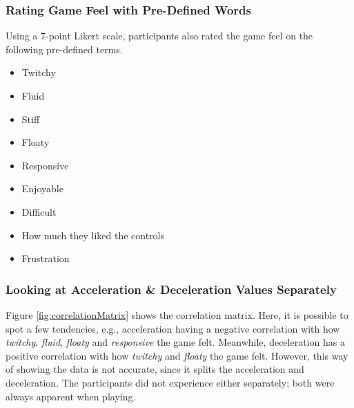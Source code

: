 \subsubsection{Rating Game Feel with Pre-Defined Words}
Using a 7-point Likert scale, participants also rated the game feel on the following pre-defined terms.
\begin{itemize}[noitemsep,nolistsep]
\item Twitchy
\item Fluid
\item Stiff
\item Floaty
\item Responsive
\item Enjoyable
\item Difficult
\item How much they liked the controls
\item Frustration
\end{itemize}

\subsubsection{Looking at Acceleration \& Deceleration Values Separately}
Figure \ref{fig:correlationMatrix} shows the correlation matrix. Here, it is possible to spot a few tendencies, e.g., acceleration having a negative correlation with how \textit{twitchy}, \textit{fluid}, \textit{floaty} and \textit{responsive} the game felt. Meanwhile, deceleration has a positive correlation with how \textit{twitchy} and \textit{floaty} the game felt. However, this way of showing the data is not accurate, since it splits the acceleration and deceleration. The participants did not experience either separately; both were always apparent when playing.




